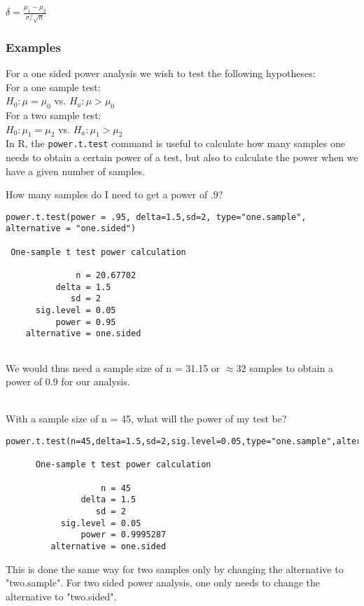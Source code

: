 \documentclass[12pt,a4paper]{article}
\theoremstyle{regla}
\theoremstyle{remark}
\theoremstyle{definition}
\theoremstyle{nonumberbreak}
\begin{document}
$\delta = \frac{\mu_1-\mu_2}{\sigma/\sqrt{n}}$
\subsubsection{Examples}
\begin{xmpl}
For a one sided power analysis we wish to test the following hypotheses:\\

For a one sample test:\\
$H_0: \mu = \mu_0$ vs. $H_a: \mu > \mu_0$\\

For a two sample test:\\
$H_0: \mu_1 = \mu_2$ vs. $H_a: \mu_1 > \mu_2$\\

In R, the \texttt{power.t.test} command is useful to calculate how many samples one needs to obtain
a certain power of a test, but also to calculate the power when we have a given number of samples.
\end{xmpl}
\begin{xmpl}
How many samples do I need to get a power of .9?\\
\begin{lstlisting}
power.t.test(power = .95, delta=1.5,sd=2, type="one.sample", alternative = "one.sided")

 One-sample t test power calculation 

              n = 20.67702
          delta = 1.5
             sd = 2
      sig.level = 0.05
          power = 0.95
    alternative = one.sided
    
\end{lstlisting}
We would thus need a sample size of n = 31.15 or $\approx 32$ samples to obtain a power of 0.9 for
our analysis.\\~\\
\end{xmpl}
\begin{xmpl}
With a sample size of n = 45, what will the power of my test be?\\

\begin{lstlisting}
power.t.test(n=45,delta=1.5,sd=2,sig.level=0.05,type="one.sample",alternative="one.sided")

      One-sample t test power calculation 
     
                   n = 45
               delta = 1.5
                  sd = 2
           sig.level = 0.05
               power = 0.9995287
         alternative = one.sided

\end{lstlisting}

This is done the same way for two samples only by changing the alternative to "two.sample". For two sided power analysis, one only needs to change the alternative to "two.sided".\\~\\
\end{xmpl}
\end{document}
